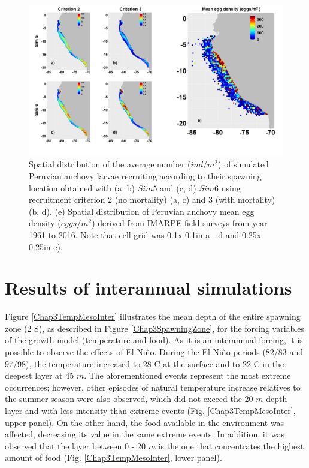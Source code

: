 \begin{figure}[t]
	\includegraphics[width=1.0\textwidth]{figures/Chap3DistPartiMapEgg.png}
	\centering
	\caption{Spatial distribution of the average number ($ind/m^2$) of simulated Peruvian anchovy larvae recruiting according to their spawning location obtained with (a, b) $Sim 5$ and (c, d) $Sim 6$ using recruitment criterion 2 (no mortality) (a, c) and 3 (with mortality) (b, d). (e) Spatial distribution of Peruvian anchovy mean egg density ($eggs/m^2$) derived from IMARPE field surveys from year 1961 to 2016. Note that cell grid was 0.1\textdegree x 0.1\textdegree in a - d and 0.25\textdegree x 0.25\textdegree in e).}
	\label{Chap3DistPartiMapEgg}
\end{figure}

\clearpage
\section{Results of interannual simulations}\label{Chap3Resu2}

Figure \ref{Chap3TempMesoInter} illustrates the mean depth of the entire spawning zone (2  \textdegree S), as described in Figure \ref{Chap3SpawningZone}, for the forcing variables of the growth model (temperature and food). As it is an interannual forcing, it is possible to observe the effects of El Niño. During the El Niño periods (82/83 and 97/98), the temperature increased to 28 \textdegree C at the surface and to 22 \textdegree C in the deepest layer at 45 $m$. The aforementioned events represent the most extreme occurrences; however, other episodes of natural temperature increase relatives to the summer season were also observed, which did not exceed the 20 $m$ depth layer and with less intensity than extreme events (Fig. \ref{Chap3TempMesoInter}, upper panel). On the other hand, the food available in the environment was affected, decreasing its value in the same extreme events. In addition, it was observed that the layer between 0 - 20 $m$ is the one that concentrates the highest amount of food (Fig. \ref{Chap3TempMesoInter}, lower panel).\\


